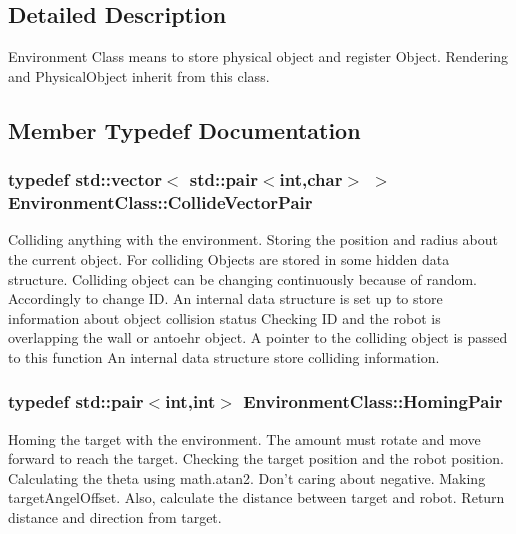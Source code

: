 \subsection{Detailed Description}
Environment Class means to store physical object and register Object. Rendering and Physical\-Object inherit from this class. 

\subsection{Member Typedef Documentation}
\hypertarget{classEnvironment_a76889d11a26328e6a105679db7cebf14}{
\subsubsection[{Collide\-Vector\-Pair}]{\setlength{\rightskip}{0pt plus 5cm}typedef std\-::vector$<$ std\-::pair$<$int,char$>$ $>$ {\bf Environment\-Class\-::\-Collide\-Vector\-Pair}}}\label{classEnvironment_a76889d11a26328e6a105679db7cebf14}
Colliding anything with the environment. Storing the position and radius about the current object. For colliding Objects are stored in some hidden data structure. Colliding object can be changing continuously because of random. Accordingly to change I\-D. An internal data structure is set up to store information about object collision status Checking I\-D and the robot is overlapping the wall or antoehr object. A pointer to the colliding object is passed to this function An internal data structure store colliding information. \hypertarget{classEnvironment_a2f5699350dc2d65fd4dc6974e03a7cf5}{
\subsubsection[{Homing\-Pair}]{\setlength{\rightskip}{0pt plus 5cm}typedef std\-::pair$<$int,int$>$ {\bf Environment\-Class\-::\-Homing\-Pair}}}\label{classEnvironment_a2f5699350dc2d65fd4dc6974e03a7cf5}
Homing the target with the environment. The amount must rotate and move forward to reach the target. Checking the target position and the robot position. Calculating the theta using math.\-atan2. Don't caring about negative. Making target\-Angel\-Offset. Also, calculate the distance between target and robot. Return distance and direction from target. 

